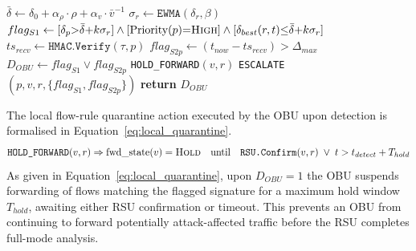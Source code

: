 \documentclass[12pt, a4paper]{report}
\begin{document}
\begin{algorithm}[H]
\caption{\ac{OBU} Lightweight Rule-Based Detection
(\texttt{LRAD-OBU})}
\begin{algorithmic}[1]
\small
{}
  \State $\bar{\delta} \gets \delta_0
         +\alpha_\rho\cdot\rho
         +\alpha_v\cdot\bar{v}^{-1}$
         \hfill{}
  \State $\sigma_r \gets \texttt{EWMA}(\delta_r,\beta)$
         \hfill{}
  \State $flag_{S1} \gets
         [\delta_p{>}\bar{\delta}{+}k\sigma_r]
         \land[\text{Priority}(p){=}\textsc{High}]
         \land[\delta_{best}(r,t){\leq}
         \bar{\delta}{+}k\sigma_r]$
         \hfill{}
  \State $ts_{recv} \gets \texttt{HMAC.Verify}(\tau,p)$
         \hfill{}
  \State $flag_{S2p} \gets
         (t_{now}-ts_{recv})>\Delta_{max}$
         \hfill{}
  \State $D_{OBU} \gets flag_{S1}\lor flag_{S2p}$
         \hfill{}
    \State \texttt{HOLD\_FORWARD}$(v,r)$
           \hfill{}
    \State \texttt{ESCALATE}$(p,v,r,
           \{flag_{S1},flag_{S2p}\})$
           \hfill{}
  \EndIf
  \State \textbf{return} $D_{OBU}$
\EndProcedure
\end{algorithmic}
\label{alg:lrad_obu}
\end{algorithm}

The local flow-rule quarantine action executed by the
\ac{OBU} upon detection is formalised in
Equation~\eqref{eq:local_quarantine}.
\begin{equation}
\texttt{HOLD\_FORWARD}(v,r) \Rightarrow
\text{fwd\_state}(v) = \textsc{Hold}
\quad\text{until}\quad
\texttt{RSU.Confirm}(v,r)\;\lor\;
t > t_{detect} + T_{hold}
\label{eq:local_quarantine}
\end{equation}
As given in Equation~\eqref{eq:local_quarantine},
upon $D_{OBU}{=}1$ the \ac{OBU} suspends forwarding
of flows matching the flagged signature for a maximum
hold window $T_{hold}$, awaiting either \ac{RSU}
confirmation or timeout. This prevents an \ac{OBU}
from continuing to forward potentially attack-affected
traffic before the \ac{RSU} completes full-mode
analysis.
\end{document}
